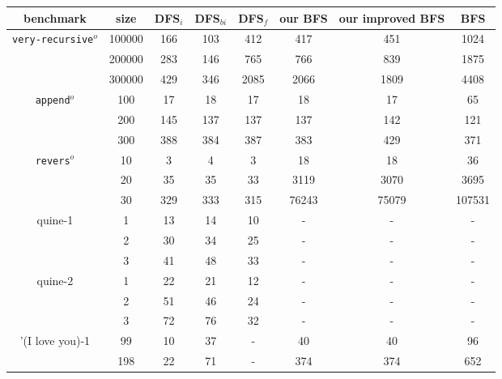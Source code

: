\documentclass[format=acmlarge, review=true, authordraft=true]{acmart}
\newcommand{\veryrecursiveo}{\texttt{very-recursive$^o$}}
\newcommand{\appendo}{\texttt{append$^o$}}
\newcommand{\reverso}{\texttt{revers$^o$}}
\newcommand{\DFSi }[0]{DFS$_{i}$}
\newcommand{\DFSf }[0]{DFS$_{f}$}
\newcommand{\DFSbi}[0]{DFS$_{bi}$}
\newcommand{\BFSser}[0]{BFS}
\newcommand{\BFSuni}[0]{our BFS}
\newcommand{\BFSimp}[0]{our improved BFS}
\begin{document}
\begin{table}
	\begin{tabular}{|c|c|c|c|c|c|c|c|}
		\hline 
	benchmark & size & \DFSi & \DFSbi & \DFSf & \BFSuni & \BFSimp & \BFSser	\\
		\hline
		\veryrecursiveo & 100000 & 166 & 103 & 412 &   417 &   451 &   1024 \\
	    				& 200000 & 283 & 146 & 765 &   766 &   839 &   1875 \\
						& 300000 & 429 & 346 &2085 &  2066 &  1809 &   4408 \\
		\hline  
		\appendo        & 	 100 &  17 &  18 &  17 &    18 &    17 &     65 \\
		         	  	& 	 200 & 145 & 137 & 137 &   137 &   142 &    121 \\
          		      	&	 300 & 388 & 384 & 387 &   383 &   429 &    371 \\
		\hline 
		\reverso		& 	  10 &   3 &   4 &   3 &    18 &    18 &     36 \\
						& 	  20 &  35 &  35 &  33 &  3119 &  3070 &   3695 \\
						& 	  30 & 329 & 333 & 315 & 76243 & 75079 & 107531 \\
		\hline
		quine-1 		& 1 & 13 & 14 & 10 & - & - & - \\
						& 2 & 30 & 34 & 25 & - & - & - \\
						& 3 & 41 & 48 & 33 & - & - & - \\
		\hline
		quine-2 		& 1 & 22 & 21 & 12 & - & - & - \\
						& 2 & 51 & 46 & 24 & - & - & - \\
						& 3 & 72 & 76 & 32 & - & - & - \\
		\hline
		'(I love you)-1 &  99 &  10 &  37 & - &   40 &   40 &   96 \\
						& 198 &  22 &  71 & - &  374 &  374 &  652 \\

\end{tabular}
\end{table}
\end{document}
